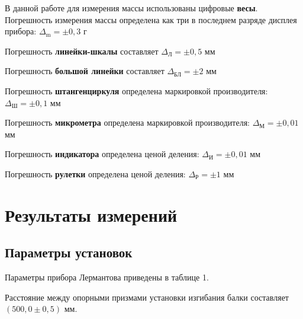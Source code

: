 \documentclass{article}
\begin{document}
\hspace{4mm} В данной работе для измерения массы использованы цифровые \textbf{весы}. Погрешность измерения массы определена как три в последнем разряде дисплея прибора: $\Delta_{\text{m}} = \pm 0,3$ г

Погрешность \textbf{линейки-шкалы} составляет $\Delta_{\text{Л}} = \pm 0,5$ мм 

Погрешность \textbf{большой линейки} составляет $\Delta_{\text{БЛ}} = \pm 2$ мм

Погрешность \textbf{штангенциркуля} определена маркировкой производителя: $\Delta_{\text{Ш}} = \pm 0,1$ мм

Погрешность \textbf{микрометра} определена маркировкой производителя: $\Delta_{\text{М}} = \pm 0,01$ мм

Погрешность \textbf{индикатора} определена ценой деления: $\Delta_{\text{И}} = \pm 0,01$ мм

Погрешность \textbf{рулетки} определена ценой деления: $\Delta_{\text{Р}} = \pm 1$ мм


\section*{Результаты измерений}

\subsection*{Параметры установок}

Параметры прибора Лермантова приведены в таблице 1.  

\begin{table}[h!]
	\centering
\end{table}

Расстояние между опорными призмами установки изгибания балки составляет $(500,0 \pm 0,5)$ мм.
\end{document}
